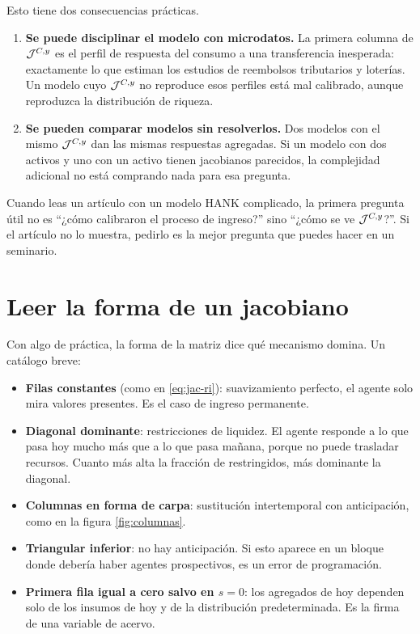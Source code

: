 Esto tiene dos consecuencias prácticas.

\begin{enumerate}[leftmargin=1.4em]
\item \textbf{Se puede disciplinar el modelo con microdatos.} La primera columna
de $\mathcal{J}^{C,y}$ es el perfil de respuesta del consumo a una transferencia
inesperada: exactamente lo que estiman los estudios de reembolsos tributarios y
loterías. Un modelo cuyo $\mathcal{J}^{C,y}$ no reproduce esos perfiles está mal
calibrado, aunque reproduzca la distribución de riqueza.
\item \textbf{Se pueden comparar modelos sin resolverlos.} Dos modelos con el
mismo $\mathcal{J}^{C,y}$ dan las mismas respuestas agregadas. Si un modelo con dos
activos y uno con un activo tienen jacobianos parecidos, la complejidad adicional
no está comprando nada para esa pregunta.
\end{enumerate}

\begin{idea}
Cuando leas un artículo con un modelo HANK complicado, la primera pregunta útil
no es ``¿cómo calibraron el proceso de ingreso?'' sino ``¿cómo se ve
$\mathcal{J}^{C,y}$?''. Si el artículo no lo muestra, pedirlo es la mejor pregunta que
puedes hacer en un seminario.
\end{idea}

\section{Leer la forma de un jacobiano}

Con algo de práctica, la forma de la matriz dice qué mecanismo domina. Un
catálogo breve:

\begin{itemize}[leftmargin=1.4em]
\item \textbf{Filas constantes} (como en \eqref{eq:jac-ri}): suavizamiento
perfecto, el agente solo mira valores presentes. Es el caso de ingreso
permanente.
\item \textbf{Diagonal dominante}: restricciones de liquidez. El agente responde
a lo que pasa hoy mucho más que a lo que pasa mañana, porque no puede trasladar
recursos. Cuanto más alta la fracción de restringidos, más dominante la diagonal.
\item \textbf{Columnas en forma de carpa}: sustitución intertemporal con
anticipación, como en la figura \ref{fig:columnas}.
\item \textbf{Triangular inferior}: no hay anticipación. Si esto aparece en un
bloque donde debería haber agentes prospectivos, es un error de programación.
\item \textbf{Primera fila igual a cero salvo en $s=0$}: los agregados de hoy
dependen solo de los insumos de hoy y de la distribución predeterminada. Es la
firma de una variable de acervo.
\end{itemize}

